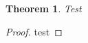 %

\newtheorem{theorem}{Theorem}

\begin{theorem}
  \label{tt:test}
  Test
\end{theorem}

\begin{proof}
test
\end{proof}
